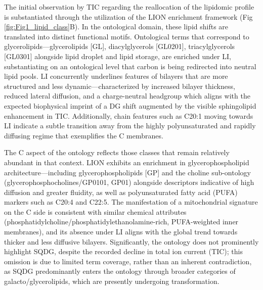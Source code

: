 \documentclass[10pt,letterpaper]{article}
\begin{document}
The initial observation by TIC regarding the reallocation of the lipidomic profile is substantiated through the utilization of the LION enrichment framework (Fig \ref{fig:Fig1_lipid_class}B). In the ontological domain, these lipid shifts are translated into distinct functional motifs. Ontological terms that correspond to glycerolipids—glycerolipids [GL], diacylglycerols [GL0201], triacylglycerols [GL0301] alongside lipid droplet and lipid storage, are enriched under LI, substantiating on an ontological level that carbon is being redirected into neutral lipid pools. LI concurrently underlines features of bilayers that are more structured and less dynamic—characterized by increased bilayer thickness, reduced lateral diffusion, and a charge-neutral headgroup which aligns with the expected biophysical imprint of a DG shift augmented by the visible sphingolipid enhancement in TIC. Additionally, chain features such as C20:1 moving towards LI indicate a subtle transition away from the highly polyunsaturated and rapidly diffusing regime that exemplifies the C membranes.

The C aspect of the ontology reflects those classes that remain relatively abundant in that context. LION exhibits an enrichment in glycerophospholipid architecture—including glycerophospholipids [GP] and the choline sub-ontology (glycerophosphocholines/GP0101, GP01) alongside descriptors indicative of high diffusion and greater fluidity, as well as polyunsaturated fatty acid (PUFA) markers such as C20:4 and C22:5. The manifestation of a mitochondrial signature on the C side is consistent with similar chemical attributes (phosphatidylcholine/phosphatidylethanolamine-rich, PUFA-weighted inner membranes), and its absence under LI aligns with the global trend towards thicker and less diffusive bilayers. Significantly, the ontology does not prominently highlight SQDG, despite the recorded decline in total ion current (TIC); this omission is due to limited term coverage, rather than an inherent contradiction, as SQDG predominantly enters the ontology through broader categories of galacto/glycerolipids, which are presently undergoing transformation.
\end{document}
